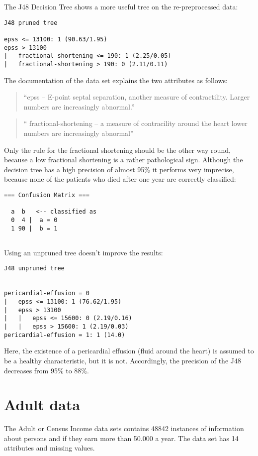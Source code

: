 \documentclass[paper=a4, fontsize=11pt]{scrartcl} %
\numberwithin{equation}{section} %
\numberwithin{figure}{section} %
\numberwithin{table}{section} %
\begin{document}
The J48 Decision Tree shows a more useful tree on the re-preprocessed data:
\begin{lstlisting}
J48 pruned tree

epss <= 13100: 1 (90.63/1.95)
epss > 13100
|   fractional-shortening <= 190: 1 (2.25/0.05)
|   fractional-shortening > 190: 0 (2.11/0.11)
\end{lstlisting}

The documentation of the data set explains the two attributes as follows:
\begin{quote}
``epss -- E-point septal separation, another measure of contractility. Larger numbers are increasingly abnormal.''
\end{quote}
\begin{quote}
`` fractional-shortening -- a measure of contracility around the heart lower numbers are increasingly abnormal''
\end{quote}

Only the rule for the fractional shortening should be the other way round, because a low fractional shortening is a rather pathological sign. Although the decision tree has a high precision of almost 95\% it performs very imprecise, because none of the patients who died after one year are correctly classified:

\begin{lstlisting}
=== Confusion Matrix ===

  a  b   <-- classified as
  0  4 |  a = 0
  1 90 |  b = 1
    
\end{lstlisting}

Using an unpruned tree doesn't improve the results:
\begin{lstlisting}
J48 unpruned tree


pericardial-effusion = 0
|   epss <= 13100: 1 (76.62/1.95)
|   epss > 13100
|   |   epss <= 15600: 0 (2.19/0.16)
|   |   epss > 15600: 1 (2.19/0.03)
pericardial-effusion = 1: 1 (14.0)
\end{lstlisting}
Here, the existence of a pericardial effusion (fluid around the heart) is assumed to be a healthy characteristic, but it is not. Accordingly, the precision of the J48 decreases from 95\% to 88\%.
\section{Adult data}

The Adult or Census Income data sets contains 48842 instances of information about persons and if they earn more than 50.000 a year. The data set has 14 attributes and missing values.
\end{document}
